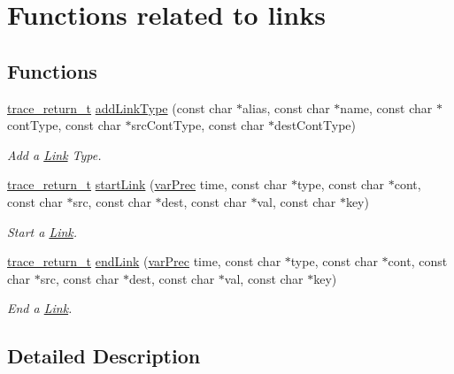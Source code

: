 \hypertarget{group__linkf}{\section{Functions related to links}
\label{group__linkf}
}
\subsection*{Functions}
\begin{DoxyCompactItemize}
\item 
\hyperlink{group__type_ga1f1b68fb37d7331f03a48ef0993a0788}{trace\-\_\-return\-\_\-t} \hyperlink{group__linkf_gab4b69cdd6b0fc990a2d99835c4bd3c89}{add\-Link\-Type} (const char $\ast$alias, const char $\ast$name, const char $\ast$cont\-Type, const char $\ast$src\-Cont\-Type, const char $\ast$dest\-Cont\-Type)
\begin{DoxyCompactList}\small\item\em Add a \hyperlink{structLink}{Link} Type. \end{DoxyCompactList}\item 
\hyperlink{group__type_ga1f1b68fb37d7331f03a48ef0993a0788}{trace\-\_\-return\-\_\-t} \hyperlink{group__linkf_ga75cf70450e81381decb2e84c3e6e18bd}{start\-Link} (\hyperlink{group__type_gabda13d5bcd0cbdb094d655181a857e25}{var\-Prec} time, const char $\ast$type, const char $\ast$cont, const char $\ast$src, const char $\ast$dest, const char $\ast$val, const char $\ast$key)
\begin{DoxyCompactList}\small\item\em Start a \hyperlink{structLink}{Link}. \end{DoxyCompactList}\item 
\hyperlink{group__type_ga1f1b68fb37d7331f03a48ef0993a0788}{trace\-\_\-return\-\_\-t} \hyperlink{group__linkf_ga9e084fd160fd4f7357f6acf4eb541606}{end\-Link} (\hyperlink{group__type_gabda13d5bcd0cbdb094d655181a857e25}{var\-Prec} time, const char $\ast$type, const char $\ast$cont, const char $\ast$src, const char $\ast$dest, const char $\ast$val, const char $\ast$key)
\begin{DoxyCompactList}\small\item\em End a \hyperlink{structLink}{Link}. \end{DoxyCompactList}\end{DoxyCompactItemize}


\subsection{Detailed Description}


